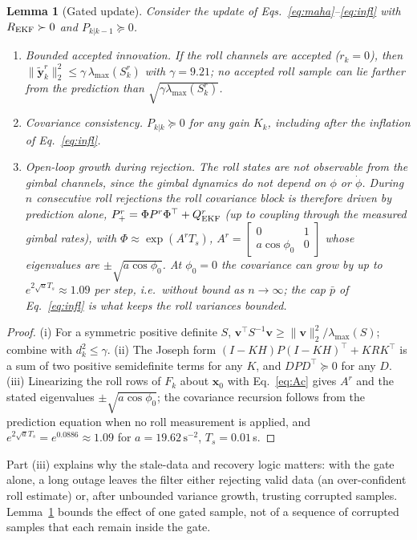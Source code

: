 \documentclass[preprint,12pt,authoryear=false]{elsarticle}
\theoremstyle{remark}\newtheorem{remark}{Remark}
\theoremstyle{plain}\newtheorem{proposition}{Proposition}\newtheorem{lemma}{Lemma}
\theoremstyle{definition}\newtheorem{assumption}{Assumption}
\begin{document}
\begin{lemma}[Gated update]\label{lem:gate}
Consider the update of Eqs.~\eqref{eq:maha}--\eqref{eq:infl} with $R_{\rm EKF}\succ0$ and $P_{k|k-1}\succeq0$.
\begin{enumerate}
\item[(i)] \emph{Bounded accepted innovation.} If the roll channels are accepted ($r_k=0$), then $\|\tilde{\bm y}^r_k\|_2^2\le\gamma\,\lambda_{\max}(S^r_k)$ with $\gamma=9.21$; no accepted roll sample can lie farther from the prediction than $\sqrt{\gamma\lambda_{\max}(S_k^r)}$.
\item[(ii)] \emph{Covariance consistency.} $P_{k|k}\succeq0$ for any gain $K_k$, including after the inflation of Eq.~\eqref{eq:infl}.
\item[(iii)] \emph{Open-loop growth during rejection.} The roll states are not observable from the gimbal channels, since the gimbal dynamics do not depend on $\phi$ or $\dot\phi$. During $n$ consecutive roll rejections the roll covariance block is therefore driven by prediction alone, $P^r_{+}=\Phi P^r\Phi^\top+Q^r_{\rm EKF}$ (up to coupling through the measured gimbal rates), with $\Phi\approx\exp(A^rT_s)$, $A^r=\begin{bmatrix}0&1\\a\cos\phi_0&0\end{bmatrix}$ whose eigenvalues are $\pm\sqrt{a\cos\phi_0}$. At $\phi_0=0$ the covariance can grow by up to $e^{2\sqrt aT_s}\approx1.09$ per step, i.e.\ without bound as $n\to\infty$; the cap $\bar p$ of Eq.~\eqref{eq:infl} is what keeps the roll variances bounded.
\end{enumerate}
\end{lemma}
\begin{proof}
(i) For a symmetric positive definite $S$, $\bm v^\top S^{-1}\bm v\ge\|\bm v\|_2^2/\lambda_{\max}(S)$; combine with $d_k^2\le\gamma$. (ii) The Joseph form $(I-KH)P(I-KH)^\top+KRK^\top$ is a sum of two positive semidefinite terms for any $K$, and $D P D^\top\succeq0$ for any $D$. (iii) Linearizing the roll rows of $F_k$ about $\bm x_0$ with Eq.~\eqref{eq:Ac} gives $A^r$ and the stated eigenvalues $\pm\sqrt{a\cos\phi_0}$; the covariance recursion follows from the prediction equation when no roll measurement is applied, and $e^{2\sqrt aT_s}=e^{0.0886}\approx1.09$ for $a=19.62\,\mathrm{s^{-2}}$, $T_s=0.01$\,s.
\end{proof}

Part (iii) explains why the stale-data and recovery logic matters: with the gate alone, a long outage leaves the filter either rejecting valid data (an over-confident roll estimate) or, after unbounded variance growth, trusting corrupted samples. Lemma~\ref{lem:gate} bounds the effect of one gated sample, not of a sequence of corrupted samples that each remain inside the gate.
\end{document}

